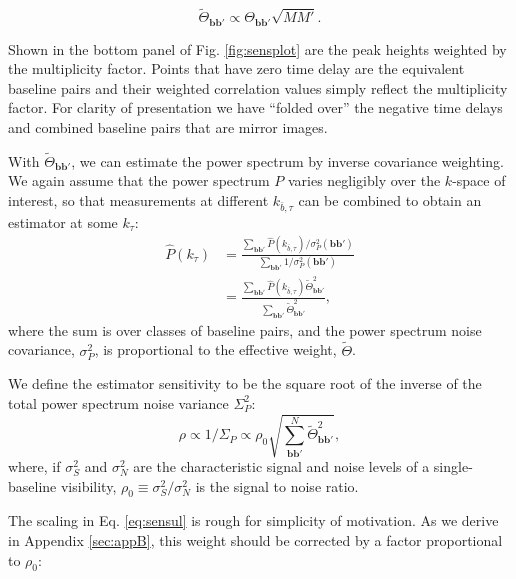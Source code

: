 \documentclass[twocolumn,apj,numberedappendix]{emulateapj}
\renewcommand\[{\begin{equation}}
\renewcommand\]{\end{equation}}
\begin{document}
\begin{equation}
\widetilde{\Theta}_{\boldsymbol{bb'}} \propto \Theta_{\boldsymbol{bb'}}\sqrt{MM'}.\label{eq:sensul}
\end{equation}

Shown in the bottom panel of Fig. \ref{fig:sensplot} are the peak heights weighted
by the multiplicity factor. Points that have zero time delay are the equivalent baseline pairs and their weighted correlation values simply reflect the multiplicity factor. For clarity of presentation we have ``folded over'' the negative time delays and combined baseline pairs that are mirror images.  

With $\widetilde{\Theta}_{\boldsymbol{bb'}}$, we can estimate the power spectrum by inverse covariance weighting. We again assume that the power spectrum $P$ varies negligibly over the $k$-space of interest, so that measurements at different $k_{\bar{b}, \tau}$ can be combined to obtain an estimator at some $k_\tau$:
\begin{equation}
\begin{aligned}
 \hat{P}(k_{\tau}) &= \frac{\sum_{\boldsymbol{bb'}}\hat{P}(k_{\bar{b}, \tau})/\sigma_P^2(\boldsymbol{bb'})}{\sum_{\boldsymbol{bb'}}1/\sigma_P^2(\boldsymbol{bb'})}\\
 &= \frac{\sum_{\boldsymbol{bb'}}\hat{P}(k_{\bar{b}, \tau})\widetilde{\Theta}_{\boldsymbol{bb'}}^2}{\sum_{\boldsymbol{bb'}}\widetilde{\Theta}_{\boldsymbol{bb'}}^2},
 \end{aligned}
\end{equation}
where the sum is over classes of baseline pairs, and the power spectrum noise covariance, $\sigma_P^2$, is proportional to the effective weight, $\widetilde{\Theta}$. 


We define the estimator sensitivity to be the square root of the inverse of the total power spectrum noise variance $\Sigma_P^2$:
\begin{equation}
\rho \propto 1/\Sigma_P \propto \rho_0\sqrt{\sum_{\boldsymbol{bb'}}^N\widetilde{\Theta}^2_{\boldsymbol{bb'}}},
\end{equation}
where, if $\sigma_S^2$ and $\sigma_N^2$ are the characteristic signal and noise levels of a single-baseline visibility, $\rho_0\equiv\sigma_S^2/\sigma_N^2$ is the signal to noise ratio. 


The scaling in Eq. \eqref{eq:sensul} is rough for simplicity of motivation. As we derive in Appendix \ref{sec:appB}, this weight should be corrected by a factor proportional to $\rho_0$:
\end{document}
